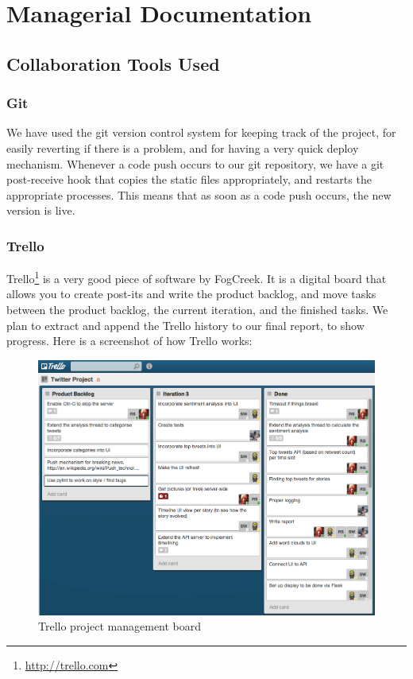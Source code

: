 \documentclass[a4paper,12pt]{article}
\begin{document}
	
	\section{Managerial Documentation}
	
		\subsection{Collaboration Tools Used}
		
			\subsubsection{Git}
			
			We have used the git version control system for keeping track of the project, for easily reverting if there is a problem, and for having a very quick deploy mechanism. Whenever a code push occurs to our git repository, we have a git post-receive hook that copies the static files appropriately, and restarts the appropriate processes. This means that as soon as a code push occurs, the new version is live.
			
			\subsubsection{Trello}
			
			Trello\footnote{\url{http://trello.com}} is a very good piece of software by FogCreek. It is a digital board that allows you to create post-its and write the product backlog, and move tasks between the product backlog, the current iteration, and the finished tasks. We plan to extract and append the Trello history to our final report, to show progress. Here is a screenshot of how Trello works:
			
			\begin{figure}[ht!]
						\centering
							\includegraphics[scale=0.4]{trello1.png}
						\caption{Trello project management board}
			\end{figure}
			
\end{document}
